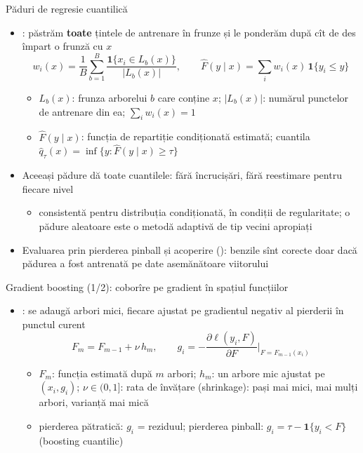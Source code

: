 \begin{frame}{Păduri de regresie cuantilică}
\itemsize{\small}
\begin{itemize}
    \item {}: păstrăm \textbf{toate} țintele de antrenare în frunze și le ponderăm după cît de des împart o frunză cu $x$
    \[ w_i(x) = \frac1B\sum_{b=1}^B \frac{\mathbf 1\{x_i \in L_b(x)\}}{|L_b(x)|}, \qquad \hat F(y\mid x) = \sum_i w_i(x)\,\mathbf 1\{y_i \le y\} \]
    \begin{itemize}
        \item $L_b(x)$: frunza arborelui $b$ care conține $x$; $|L_b(x)|$: numărul punctelor de antrenare din ea; $\sum_i w_i(x) = 1$
        \item $\hat F(y\mid x)$: funcția de repartiție condiționată estimată; cuantila $\hat q_\tau(x) = \inf\{y: \hat F(y\mid x) \ge \tau\}$
    \end{itemize}
    \item Aceeași pădure dă toate cuantilele: fără încrucișări, fără reestimare pentru fiecare nivel
    \begin{itemize}
        \item consistentă pentru distribuția condiționată, în condiții de regularitate; o pădure aleatoare este o metodă adaptivă de tip vecini apropiați
    \end{itemize}
    \item Evaluarea prin pierderea pinball și acoperire (): benzile sînt corecte doar dacă pădurea a fost antrenată pe date asemănătoare viitorului
\end{itemize}
\end{frame}

\begin{frame}{Gradient boosting (1/2): coborîre pe gradient în spațiul funcțiilor}
\itemsize{\small}
\begin{itemize}
    \item {}: se adaugă arbori mici, fiecare ajustat pe gradientul negativ al pierderii în punctul curent
    \[ F_m = F_{m-1} + \nu\,h_m, \qquad g_i = -\frac{\partial\ell(y_i, F)}{\partial F}\Big|_{F = F_{m-1}(x_i)} \]
    \begin{itemize}
        \item $F_m$: funcția estimată după $m$ arbori; $h_m$: un arbore mic ajustat pe $(x_i, g_i)$; $\nu \in (0, 1]$: rata de învățare (shrinkage): pași mai mici, mai mulți arbori, varianță mai mică
        \item pierderea pătratică: $g_i$ = reziduul; pierderea pinball: $g_i = \tau - \mathbf 1\{y_i < F\}$ (boosting cuantilic)
    \end{itemize}
\end{itemize}
\end{frame}

